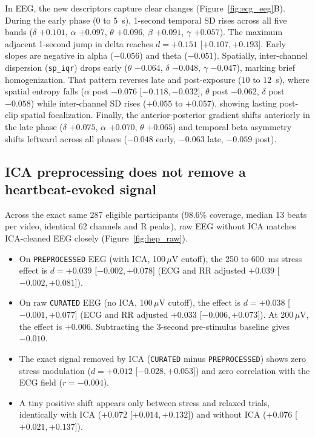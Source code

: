 \documentclass[10pt]{article}
\begin{document}
In EEG, the new descriptors capture clear changes (Figure~\ref{fig:ecg_eeg}B). During the early phase ($0$ to $5$~s), 1-second temporal SD rises across all five bands ($\delta$ $+0.101$, $\alpha$ $+0.097$, $\theta$ $+0.096$, $\beta$ $+0.091$, $\gamma$ $+0.057$). The maximum adjacent 1-second jump in delta reaches $d = +0.151$ [$+0.107, +0.193$]. Early slopes are negative in alpha ($-0.056$) and theta ($-0.051$). Spatially, inter-channel dispersion (\texttt{sp\_iqr}) drops early ($\theta$ $-0.064$, $\delta$ $-0.048$, $\gamma$ $-0.047$), marking brief homogenization. That pattern reverses late and post-exposure ($10$ to $12$~s), where spatial entropy falls ($\alpha$ post $-0.076$ [$-0.118, -0.032$], $\theta$ post $-0.062$, $\delta$ post $-0.058$) while inter-channel SD rises ($+0.055$ to $+0.057$), showing lasting post-clip spatial focalization. Finally, the anterior-posterior gradient shifts anteriorly in the late phase ($\delta$ $+0.075$, $\alpha$ $+0.070$, $\theta$ $+0.065$) and temporal beta asymmetry shifts leftward across all phases ($-0.048$ early, $-0.063$ late, $-0.059$ post).

\subsection{ICA preprocessing does not remove a heartbeat-evoked signal}

Across the exact same 287 eligible participants (98.6\% coverage, median 13 beats per video, identical 62 channels and R peaks), raw EEG without ICA matches ICA-cleaned EEG closely (Figure~\ref{fig:hep_raw}).
\begin{itemize}
\item On \texttt{PREPROCESSED} EEG (with ICA, 100\,$\mu$V cutoff), the 250 to 600~ms stress effect is $d = +0.039$ [$-0.002, +0.078$] (ECG and RR adjusted $+0.039$ [$-0.002, +0.081$]).
\item On raw \texttt{CURATED} EEG (no ICA, 100\,$\mu$V cutoff), the effect is $d = +0.038$ [$-0.001, +0.077$] (ECG and RR adjusted $+0.033$ [$-0.006, +0.073$]). At 200\,$\mu$V, the effect is $+0.006$. Subtracting the 3-second pre-stimulus baseline gives $-0.010$.
\item The exact signal removed by ICA (\texttt{CURATED} minus \texttt{PREPROCESSED}) shows zero stress modulation ($d = +0.012$ [$-0.028, +0.053$]) and zero correlation with the ECG field ($r = -0.004$).
\item A tiny positive shift appears only between stress and relaxed trials, identically with ICA ($+0.072$ [$+0.014, +0.132$]) and without ICA ($+0.076$ [$+0.021, +0.137$]).
\end{itemize}
\end{document}

